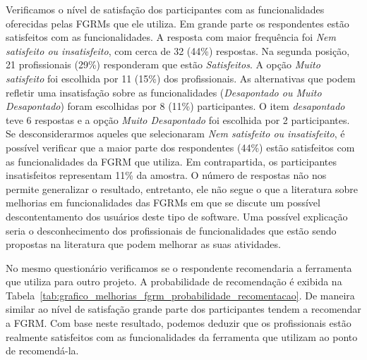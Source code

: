 Verificamos o nível de satisfação dos participantes com as funcionalidades
oferecidas pelas FGRMs que ele utiliza. Em grande parte os respondentes estão
satisfeitos com as funcionalidades. A resposta com maior frequência foi
\textit{Nem satisfeito ou insatisfeito}, com cerca de 32 (44\%) respostas. Na
segunda posição, 21 profissionais (29\%) responderam que estão
\textit{Satisfeitos}. A opção \textit{Muito satisfeito} foi escolhida por 11
(15\%) dos profissionais. As alternativas que podem refletir uma insatisfação
sobre as funcionalidades (\textit{Desapontado ou Muito Desapontado}) foram
escolhidas por 8 (11\%) participantes. O item \textit{desapontado} teve 6
respostas e a opção \textit{Muito Desapontado} foi escolhida por 2
participantes. Se desconsiderarmos aqueles que selecionaram \textit{Nem
    satisfeito ou insatisfeito}, é possível verificar que a maior parte dos
respondentes (44\%) estão satisfeitos com as funcionalidades da FGRM que
utiliza. Em contrapartida, os participantes insatisfeitos representam 11\% da
amostra. O número de respostas não nos permite generalizar o resultado,
entretanto, ele não segue o que a literatura sobre melhorias em funcionalidades
das FGRMs em que se discute um possível descontentamento dos usuários deste
tipo de software. Uma possível explicação seria o desconhecimento dos
profissionais de funcionalidades que estão sendo propostas na literatura que
podem melhorar as suas atividades.

No mesmo questionário verificamos se o respondente recomendaria a ferramenta
que utiliza para outro projeto. A probabilidade de recomendação é exibida na
Tabela~\ref{tab:grafico_melhorias_fgrm_probabilidade_recomentacao}. De maneira
similar ao nível de satisfação grande parte dos participantes tendem a
recomendar a FGRM\@. Com base neste resultado, podemos deduzir que os
profissionais estão realmente satisfeitos com as funcionalidades da ferramenta
que utilizam ao ponto de recomendá-la.

\begin{table}[htpb]
\centering
{}
\caption{Probabilidade de Recomendação da Ferramenta Utilizada}\label{tab:grafico_melhorias_fgrm_probabilidade_recomentacao}
\end{table}

